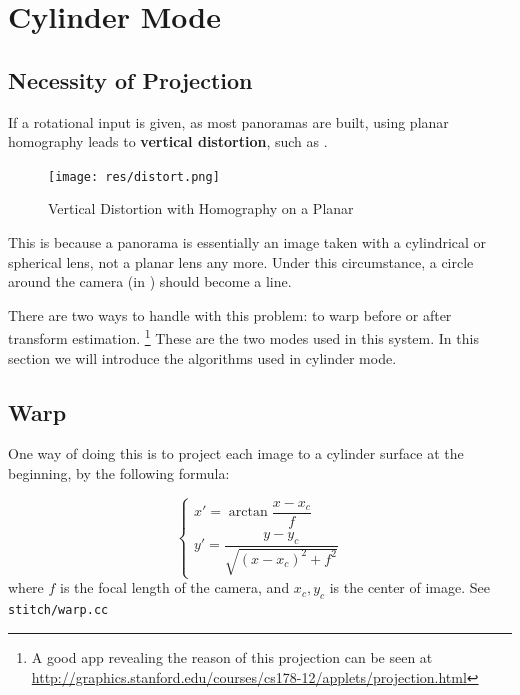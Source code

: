 
\section{Cylinder Mode}
\label{sec:cylinder}
\subsection{Necessity of Projection}
If a rotational input is given, as most panoramas are built,
using planar homography leads to \textbf{vertical distortion}, such as .
\begin{figure}[H]
  \centering
  \texttt{[image: res/distort.png]}
  \caption{Vertical Distortion with Homography on a Planar\label{fig:distort}}
\end{figure}

This is because a panorama is essentially an image taken with
a cylindrical or spherical lens, not a planar lens any more.
Under this circumstance, a circle around the camera (in ) should
become a line.

There are two ways to handle with this problem: to warp before or after
transform estimation.
\footnote{A good app revealing the reason of this projection can be seen at \url{http://graphics.stanford.edu/courses/cs178-12/applets/projection.html}}
These are the two modes used in this system. In this section we will
introduce the algorithms used in cylinder mode.

\subsection{Warp}
One way of doing this is to project each image
to a cylinder surface at the beginning, by the following formula:

\[  \begin{cases}
    x' = \arctan{\dfrac{x-x_c}{f}}\\
    y' = \dfrac{y-y_c}{\sqrt{(x-x_c)^2 + f^2}}
  \end{cases}\]
where $ f$ is the focal length of the camera, and $ x_c, y_c$ is the center of image.
See \verb|stitch/warp.cc|

